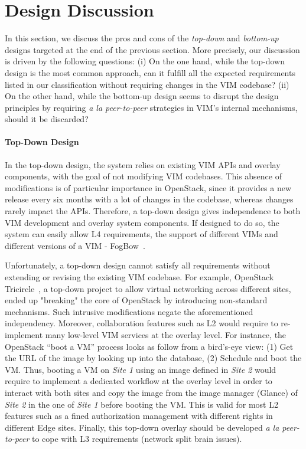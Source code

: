 
\section{Design Discussion}
\label{sec:design_discussion}

In this section, we discuss the pros and cons of the \emph{top-down} and
\emph{bottom-up} designs targeted at the end of the previous section.
More precisely, our discussion is driven by the following questions:
(i) On the one hand, while the top-down design is the most common
approach, can it fulfill all the expected requirements listed in our
classification without requiring changes in the VIM codebase? (ii) On the other hand, while the bottom-up design
seems to disrupt the design principles by requiring \emph{a la
  peer-to-peer} strategies in VIM's internal mechanisms, should it be
discarded?

\paragraph{Top-Down Design}
In the top-down design, the system relies on existing VIM APIs and overlay
components, with the goal of not modifying VIM codebases. This
absence of modifications is of particular importance in OpenStack,
since it provides a new release every six months with a lot of changes
in the codebase, whereas changes rarely impact the APIs. Therefore, a
top-down design gives independence to both VIM development and overlay
system components. If designed to do so, the system can easily allow
L4 requirements, \ie the support of different VIMs and different
versions of a VIM - \eg FogBow~\cite{brasileiro2016fogbow}.

Unfortunately, a top-down design cannot satisfy all requirements
without extending or revising the existing VIM codebase.  For example,
OpenStack Tricircle~\cite{tricircle}, a top-down project to allow
virtual networking across different sites, ended up "breaking" the
core of OpenStack by introducing non-standard mechanisms. Such
intrusive modifications negate the aforementioned independency.
%
Moreover, collaboration features such as L2 would require to
re-implement many low-level VIM services at the overlay level. For
instance, the OpenStack ``boot a VM'' process looks as follow from a
bird's-eye view: (1) Get the URL of the image by looking up into the
database, (2) Schedule and boot the VM. Thus, booting a VM on
\emph{Site 1} using an image defined in \emph{Site 2} would require to
implement a dedicated workflow at the overlay level in order to
interact with both sites and copy the image from the image manager
(\ie Glance) of \emph{Site 2} in the one of \emph{Site 1} before booting the VM. 
%
This is valid for most L2 features such as a fined authorization management
with different rights in different Edge sites.
%
Finally, this top-down overlay should be developed \emph{a la
  peer-to-peer} to cope with L3 requirements (\ie network split brain
issues).


